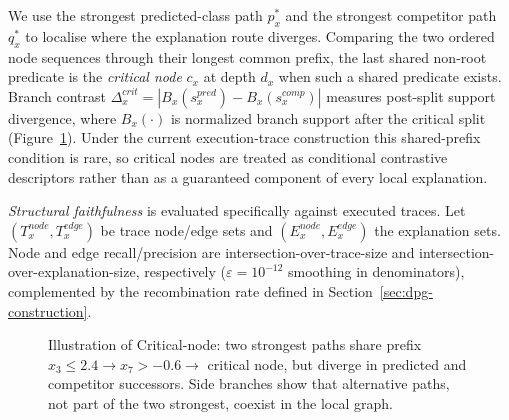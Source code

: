 \documentclass[runningheads]{llncs}
\begin{document}
We use the strongest predicted-class path $p_x^\ast$ and the strongest competitor path $q_x^\ast$ to localise where the explanation route diverges. Comparing the two ordered node sequences through their longest common prefix, the last shared non-root predicate is the \emph{critical node} $c_x$ at depth $d_x$ when such a shared predicate exists. Branch contrast $\Delta_x^{crit}=|B_x(s_x^{pred})-B_x(s_x^{comp})|$ measures post-split support divergence, where $B_x(\cdot)$ is normalized branch support after the critical split (Figure~\ref{fig:critical-node-example}). Under the current execution-trace construction this shared-prefix condition is rare, so critical nodes are treated as conditional contrastive descriptors rather than as a guaranteed component of every local explanation.

\textit{Structural faithfulness} is evaluated specifically against executed traces. Let $(T_x^{node},T_x^{edge})$ be trace node/edge sets and $(E_x^{node},E_x^{edge})$ the explanation sets. Node and edge recall/precision are intersection-over-trace-size and intersection-over-explanation-size, respectively ($\varepsilon=10^{-12}$ smoothing in denominators), complemented by the recombination rate defined in Section~\ref{sec:dpg-construction}.

\begin{figure}[h]
\centering
{}
\caption{Illustration of Critical-node: two strongest paths share prefix $x_3 \le 2.4 \to x_7 > -0.6 \to$ critical node, but diverge in predicted and competitor successors. Side branches show that alternative paths, not part of the two strongest,  coexist in the local graph.}
\label{fig:critical-node-example}
\end{figure}
\end{document}
